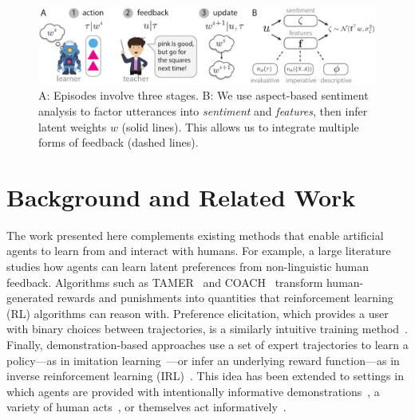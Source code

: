 \documentclass[letterpaper]{article} %
\begin{document}
\begin{figure}[t]
\begin{center}
\includegraphics[width=17.5cm]{images/Fig1}
\end{center}
\caption{A: Episodes involve three stages. B: We use aspect-based sentiment analysis to factor utterances into \textit{sentiment} and \textit{features}, then infer latent weights $w$ (solid lines). This allows us to integrate multiple forms of feedback (dashed lines).}
\label{irl_language_schematic}
\end{figure}

\section{Background and Related Work}
\label{related_work_section}
The work presented here complements existing methods that enable artificial agents to learn from and interact with humans. For example, a large literature studies how agents can learn latent preferences from non-linguistic human feedback. Algorithms such as TAMER~\cite{Knox2009Interactively} and COACH~\cite{macglashan2017interactive} transform human-generated rewards and punishments into quantities that reinforcement learning (RL) algorithms can reason with. Preference elicitation, which provides a user with binary choices between trajectories, is a similarly intuitive training method~\cite{christiano2017deep}. Finally, demonstration-based approaches use a set of expert trajectories to learn a policy---as in imitation learning~\cite{ross2010efficient}---or infer an underlying reward function---as in inverse reinforcement learning (IRL)~\cite{abbeel2004apprenticeship}. This idea has been extended to settings in which agents are provided with intentionally informative demonstrations~\cite{ho2016showing}, a variety of human acts~\cite{jeon2020rewardrational}, or themselves act informatively~\cite{Dragan2013Legibility, HadfieldMenell2016cooperative}.
\end{document}
